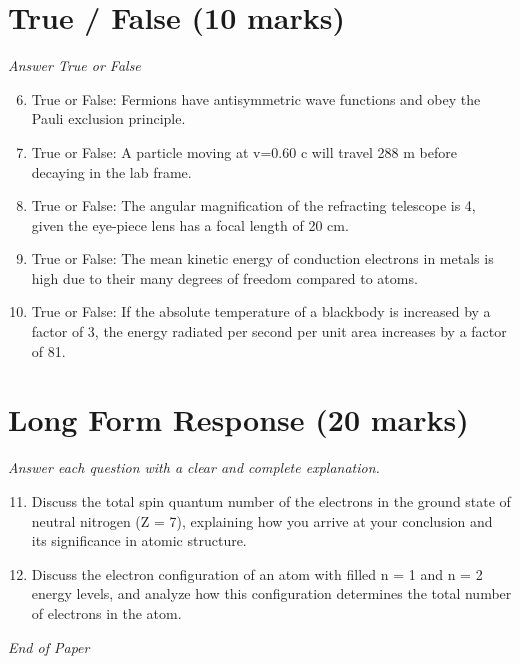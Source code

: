 \documentclass[12pt]{article}
\begin{document}
\section*{True / False (10 marks)}
\textit{Answer True or False}
\begin{enumerate}[label=\arabic*.]
\setcounter{enumi}{5}
\item True or False: Fermions have antisymmetric wave functions and obey the Pauli exclusion principle.
\item True or False: A particle moving at v=0.60 c will travel 288 m before decaying in the lab frame.
\item True or False: The angular magnification of the refracting telescope is 4, given the eye-piece lens has a focal length of 20 cm.
\item True or False: The mean kinetic energy of conduction electrons in metals is high due to their many degrees of freedom compared to atoms.
\item True or False: If the absolute temperature of a blackbody is increased by a factor of 3, the energy radiated per second per unit area increases by a factor of 81.
\end{enumerate}

\section*{Long Form Response (20 marks)}
\textit{Answer each question with a clear and complete explanation.}
\begin{enumerate}[label=\arabic*.]
\setcounter{enumi}{10}
\item Discuss the total spin quantum number of the electrons in the ground state of neutral nitrogen (Z = 7), explaining how you arrive at your conclusion and its significance in atomic structure.
\item Discuss the electron configuration of an atom with filled n = 1 and n = 2 energy levels, and analyze how this configuration determines the total number of electrons in the atom.
\end{enumerate}

\vfill
\noindent\textit{End of Paper}
\end{document}
